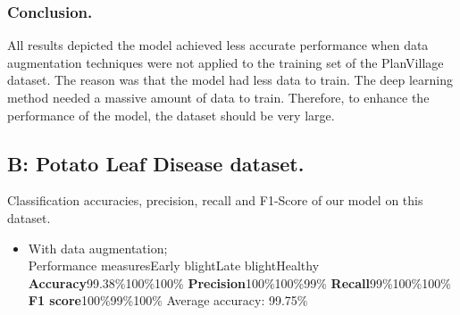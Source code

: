 \documentclass[11pt]{report}
\begin{document}
\subsubsection*{Conclusion.}
All results depicted the model achieved less accurate performance when data augmentation techniques were not applied to the training set of the
PlanVillage dataset. The reason was that the model had less data to train. The
deep learning method needed a massive amount of data to train. Therefore, to enhance the
performance of the model, the dataset should be very large.\\


\newpage
\subsection*{B: Potato Leaf Disease dataset.}
Classification accuracies, precision, recall and F1-Score of our model on this dataset.\\

\begin{itemize}
	\item With data augmentation;\\
	Performance measures\hspace{3cm}Early blight\hspace{2cm}Late blight\hspace{2cm}Healthy\\
	\textbf{Accuracy}\hspace{6cm}99.38\%\hspace{3cm}100\%\hspace{2.5cm}100\%
	\textbf{Precision}\hspace{6cm}100\%\hspace{3.5cm}100\%\hspace{2.5cm}99\%
	\textbf{Recall}\hspace{6.5cm}99\%\hspace{3.5cm}100\%\hspace{2.5cm}100\%
	\textbf{F1 score}\hspace{6cm}100\%\hspace{3.5cm}99\%\hspace{2.5cm}100\%
	Average accuracy: 99.75\%
	
\end{itemize}
\end{document}
